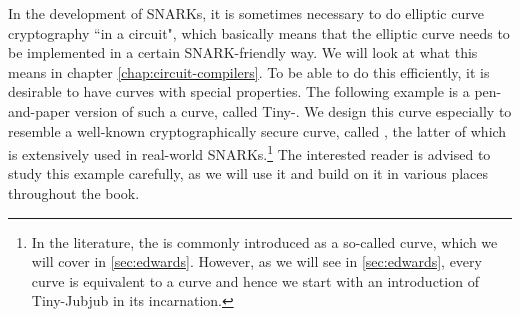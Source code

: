 In the development of SNARKs, it is sometimes necessary to do elliptic curve cryptography ``in a circuit", which basically means that the elliptic curve needs to be implemented in a certain SNARK-friendly way. We will look at what this means in chapter \ref{chap:circuit-compilers}. To be able to do this efficiently, it is desirable to have curves with special properties. The following example is a pen-and-paper version of such a curve, called Tiny-. We design this curve especially to resemble a well-known cryptographically secure curve, called , the latter of which is extensively used in real-world SNARKs.\footnote{In the literature, the  is commonly introduced as a so-called  curve, which we will cover in \ref{sec:edwards}. However, as we will see in \ref{sec:edwards}, every  curve is equivalent to a  curve and hence we start with an introduction of Tiny-Jubjub in its  incarnation.} 
The interested reader is advised to study this example carefully, as we will use it and build on it in various places throughout the book. 

